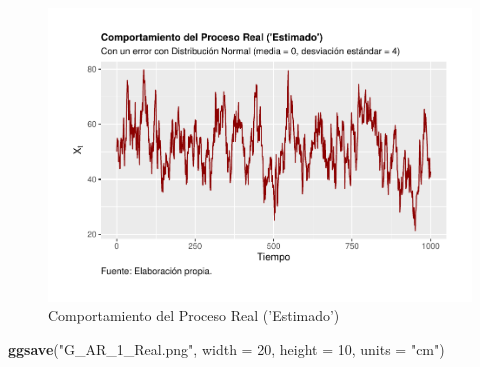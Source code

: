 \documentclass[
]{book}
\newenvironment{Shaded}{\begin{snugshade}}{\end{snugshade}}
\newcommand{\AttributeTok}[1]{\textcolor[rgb]{0.13,0.29,0.53}{#1}}
\newcommand{\DecValTok}[1]{\textcolor[rgb]{0.00,0.00,0.81}{#1}}
\newcommand{\FunctionTok}[1]{\textcolor[rgb]{0.13,0.29,0.53}{\textbf{#1}}}
\newcommand{\NormalTok}[1]{#1}
\newcommand{\StringTok}[1]{\textcolor[rgb]{0.31,0.60,0.02}{#1}}
\begin{document}
\begin{figure}

{\centering \includegraphics{Notas-Series-Tiempo_files/figure-latex/fig41-1} 

}

\caption{Comportamiento del Proceso Real ('Estimado')}\label{fig:fig41}
\end{figure}

\begin{Shaded}
\begin{Highlighting}[]
\FunctionTok{ggsave}\NormalTok{(}\StringTok{"G\_AR\_1\_Real.png"}\NormalTok{, }\AttributeTok{width =} \DecValTok{20}\NormalTok{, }\AttributeTok{height =} \DecValTok{10}\NormalTok{, }\AttributeTok{units =} \StringTok{"cm"}\NormalTok{)}
\end{Highlighting}
\end{Shaded}
\end{document}

